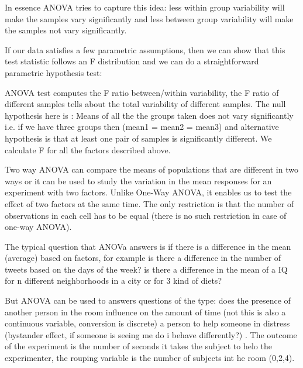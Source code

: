 \documentclass[11pt]{article}
\theoremstyle{definition}
\theoremstyle{remark}
\begin{document}
In essence ANOVA tries to capture this idea:  less within group variability will make the samples vary significantly and less between group variability will make the samples not vary significantly. 

If our data satisfies a few parametric assumptions, then we can show that this test statistic follows an F distribution and we can do a straightforward parametric hypothesis test:

ANOVA test computes the F ratio between/within variability, the F ratio of different samples tells about the total variability of different samples.
The null hypothesis here is : Means of all the the groups taken does not vary significantly i.e. if we have three groups then (mean1 = mean2 = mean3) and alternative hypothesis is that at least one pair of samples is significantly different.
We calculate F for all the factors described above.


Two way ANOVA can compare the means of populations that are different in two ways or it can be used to study the variation in the mean responses for an experiment with two factors. Unlike One-Way ANOVA, it enables us to test the effect of two factors at the same time. The only restriction is that the number of observations in each cell has to be equal (there is no such restriction in case of one-way ANOVA).



The typical question that ANOVa answers is if there is a difference in the mean (average) based on factors, for example is there a difference in the number of tweets based on the days of the week? is there a difference in the mean of a IQ for n different neighborhoods in a city or for 3 kind of diets?

But ANOVA can be used to answers questions of the type: does the presence of another person in the room influence on the amount of time (not this is also a continuous variable, conversion is discrete) a person to help someone in distress (bystander effect, if someone is seeing me do i behave differently?) \cite{darley1968bystander}. The outcome of the experiment is the number of seconds it takes the subject to helo the experimenter, the rouping variable is the number of subjects int he room (0,2,4).
\end{document}
